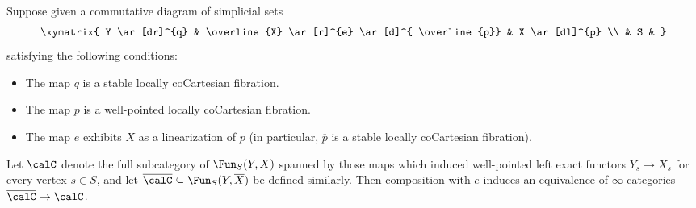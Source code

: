 \begin{theorem}\label{kalet}
Suppose given a commutative diagram of simplicial sets
$$ \xymatrix{ Y \ar[dr]^{q} & \overline{X} \ar[r]^{e} \ar[d]^{ \overline{p}} & X \ar[dl]^{p} \\
& S & }$$
satisfying the following conditions:
\begin{itemize}
\item[$(1)$] The map $q$ is a stable locally coCartesian fibration.
\item[$(2)$] The map $p$ is a well-pointed locally coCartesian fibration.
\item[$(3)$] The map $e$ exhibits $\overline{X}$ as a linearization of
$p$ (in particular, $\overline{p}$ is a stable locally coCartesian fibration).
\end{itemize}
Let $\calC$ denote the full subcategory of $\Fun_{S}(Y,X)$ spanned by those
maps which induced well-pointed left exact functors $Y_{s} \rightarrow X_{s}$ for every vertex $s \in S$, and let $\overline{\calC} \subseteq \Fun_{S}( Y, \overline{X} )$ be defined similarly.
Then composition with $e$ induces an equivalence of $\infty$-categories
$\overline{\calC} \rightarrow \calC$.
\end{theorem}

